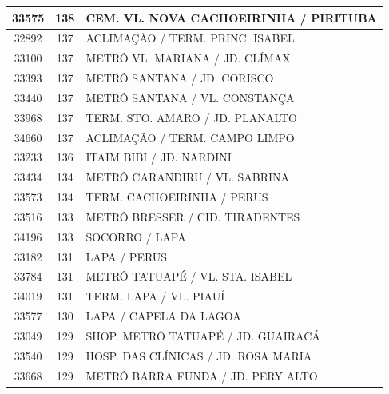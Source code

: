\documentclass[
	12pt,				%
	oneside,			%
	a4paper,			%
	english,			%
	brazil				%
	]{abntex2ppgsi}
\begin{document}
{{\begin{apendicesenv}
\begin{longtable}{c|c|p{7cm}}
    33575 & 138   & CEM. VL. NOVA CACHOEIRINHA / PIRITUBA \\
\hline

    32892 & 137   & ACLIMAÇÃO / TERM. PRINC. ISABEL \\
\hline

    33100 & 137   & METRÔ VL. MARIANA / JD. CLÍMAX \\
\hline

    33393 & 137   & METRÔ SANTANA / JD. CORISCO \\
\hline

    33440 & 137   & METRÔ SANTANA / VL. CONSTANÇA \\
\hline

    33968 & 137   & TERM. STO. AMARO / JD. PLANALTO \\
\hline

    34660 & 137   & ACLIMAÇÃO / TERM. CAMPO LIMPO \\
\hline

    33233 & 136   & ITAIM BIBI / JD. NARDINI \\
\hline

    33434 & 134   & METRÔ CARANDIRU / VL. SABRINA \\
\hline

    33573 & 134   & TERM. CACHOEIRINHA / PERUS \\
\hline

    33516 & 133   & METRÔ BRESSER / CID. TIRADENTES \\
\hline

    34196 & 133   & SOCORRO / LAPA \\
\hline

    33182 & 131   & LAPA / PERUS \\
\hline

    33784 & 131   & METRÔ TATUAPÉ / VL. STA. ISABEL \\
\hline

    34019 & 131   & TERM. LAPA / VL. PIAUÍ \\
\hline

    33577 & 130   & LAPA / CAPELA DA LAGOA  \\
\hline

    33049 & 129   & SHOP. METRÔ TATUAPÉ / JD. GUAIRACÁ \\
\hline

    33540 & 129   & HOSP. DAS CLÍNICAS / JD. ROSA MARIA \\
\hline

    33668 & 129   & METRÔ BARRA FUNDA / JD. PERY ALTO \\
\hline


\end{longtable}
\end{apendicesenv}}}
\end{document}
